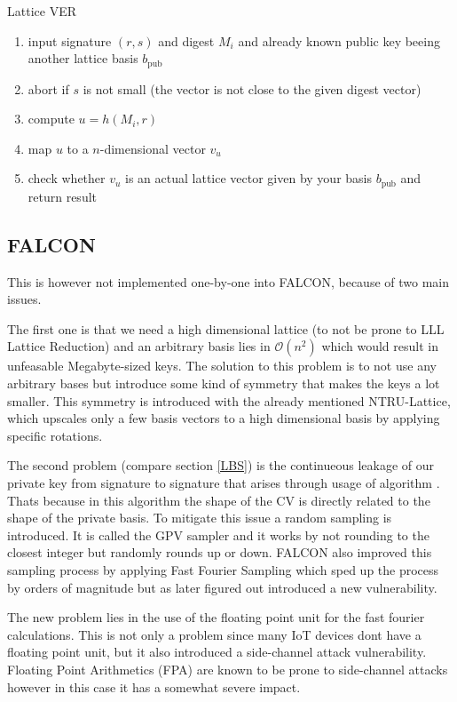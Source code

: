 \documentclass[conference]{IEEEtran}
\begin{document}
\begin{algorithm}
    \caption{Lattice VER}\label{alg:lattice ver v1}
        \begin{enumerate}
            \item input signature $(r,s)$ and digest $M_i$ and already known public key beeing another lattice basis $b_\text{pub}$
            \item abort if $s$ is not small (the vector is not close to the given digest vector)
            \item compute $u=h(M_i,r)$
            \item map $u$ to a $n$-dimensional vector $v_u$
            \item check whether $v_u$ is an actual lattice vector given by your basis $b_\text{pub}$ and return result
        \end{enumerate}
    \end{algorithm}

\subsection{FALCON}

This is however not implemented one-by-one into FALCON, because of two main issues.

The first one is that we need a high dimensional lattice (to not be prone to LLL Lattice Reduction) and an arbitrary basis lies in $\mathcal{O}(n^2)$ which would result in unfeasable Megabyte-sized keys.
The solution to this problem is to not use any arbitrary bases but introduce some kind of symmetry that makes the keys a lot smaller. This symmetry is introduced with the already mentioned NTRU-Lattice, which upscales only a few basis vectors to a high dimensional basis by applying specific rotations.

The second problem (compare section \ref{LBS}) is the continueous leakage of our private key from signature to signature that arises through usage of algorithm \label{alg:babel}. Thats because in this algorithm the shape of the CV is directly related to the shape of the private basis.
To mitigate this issue a random sampling is introduced. It is called the GPV sampler \cite{falcon_easyier_read} and it works by not rounding to the closest integer but randomly rounds up or down.
FALCON also improved this sampling process by applying Fast Fourier Sampling which sped up the process by orders of magnitude but as later figured out introduced a new vulnerability. 

The new problem lies in the use of the floating point unit for the fast fourier calculations. This is not only a problem since many IoT devices dont have a floating point unit, but it also introduced a side-channel attack vulnerability.
Floating Point Arithmetics (FPA) are known to be prone to side-channel attacks however in this case it has a somewhat severe impact.
\end{document}
